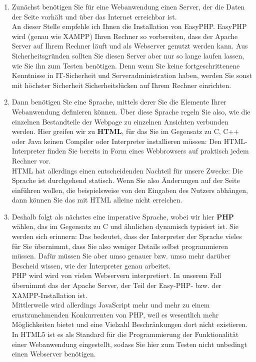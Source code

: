 \begin{enumerate}
	\item Zunächst benötigen Sie für eine Webanwendung einen Server, der die Daten der Seite vorhält und über das Internet erreichbar ist.\\
	An dieser Stelle empfehle ich Ihnen die Installation von EasyPHP. EasyPHP wird (genau wie XAMPP) Ihren Rechner so vorbereiten, dass der Apache Server auf Ihrem Rechner läuft und als Webserver genutzt werden kann. Aus Sicherheitsgründen sollten Sie diesen Server aber nur so lange laufen lassen, wie Sie ihn zum Testen benötigen. Denn wenn Sie keine fortgeschrittenene Kenntnisse in IT-Sicherheit und Serveradministration haben, werden Sie sonst mit höchster Sicherheit Sicherheitslücken auf Ihrem Rechner einrichten.\\
	\item Dann benötigen Sie eine Sprache, mittels derer Sie die Elemente Ihrer Webanwendung definieren können. Über diese Sprache regeln Sie also, wie die einzelnen Bestandteile der Webpage zu einzelnen Ansichten verbunden werden. Hier greifen wir zu \textbf{HTML}, für das Sie im Gegensatz zu C, C++ oder Java keinen Compiler oder Interpreter installieren müssen: Den HTML-Interpreter finden Sie bereits in Form eines Webbrowsers auf praktisch jedem Rechner vor.\\
	HTML hat allerdings einen entscheidenden Nachteil für unsere Zwecke: Die Sprache ist durchgehend statisch. Wenn Sie also Änderungen auf der Seite einführen wollen, die beispielsweise von den Eingaben des Nutzers abhängen, dann können Sie das mit HTML alleine nicht erreichen.\\
	\item Deshalb folgt als nächstes eine imperative Sprache, wobei wir hier \textbf{PHP} wählen, das im Gegensatz zu C und ähnlichen dynamisch typisiert ist. Sie werden sich erinnern: Das bedeutet, dass der Interpreter der Sprache vieles für Sie übernimmt, dass Sie also weniger Details selbst programmieren müssen. Dafür müssen Sie aber umso genauer bzw. umso mehr darüber Bescheid wissen, wie der Interpreter genau arbeitet.\\
	PHP wird wird von vielen Webservern interpretiert. In unserem Fall übernimmt das der Apache Server, der Teil der Easy-PHP- bzw. der XAMPP-Installation ist.\\
	Mittlerweile wird allerdings JavaScript mehr und mehr zu einem \\ernstzunehmenden Konkurrenten von PHP, weil es wesentlich mehr Möglichkeiten bietet und eine Vielzahl Beschränkungen dort nicht existieren. In HTML5 ist es als Standard für die Programmierung der Funktionalität einer Webanwendung eingestellt, sodass Sie hier zum Testen nicht unbedingt einen Webserver benötigen.\\

\end{enumerate}
